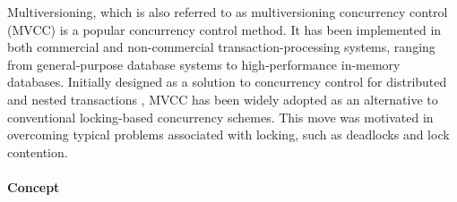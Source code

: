 %

Multiversioning, which is also referred to as multiversioning concurrency
control (MVCC) is a popular concurrency control method. It has been implemented
in both commercial and non-commercial transaction-processing systems, ranging
from general-purpose database systems to high-performance in-memory databases.
Initially designed as a solution to concurrency control for distributed and
nested transactions \cite{reed1978naming}, MVCC has been widely adopted as an
alternative to conventional locking-based concurrency schemes. This move was
motivated in overcoming typical problems associated with locking, such as
deadlocks and lock contention.

\paragraph{Concept}

